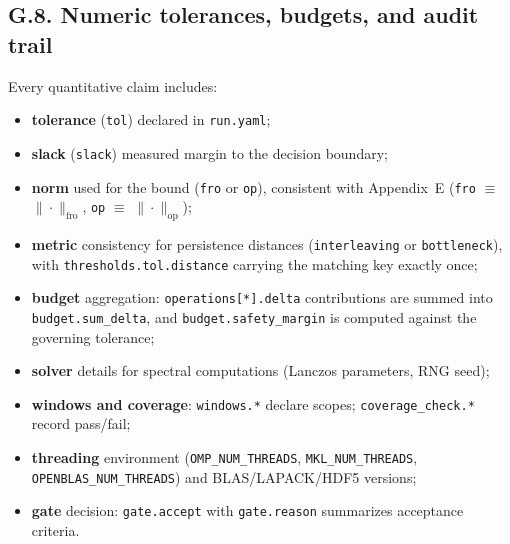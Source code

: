 \documentclass[11pt]{article}
\numberwithin{equation}{section}
\theoremstyle{definition}
\begin{document}
\subsection*{G.8. Numeric tolerances, budgets, and audit trail}
Every quantitative claim includes:
{\setlength{\emergencystretch}{2em}%
\begin{itemize}
\item \textbf{tolerance} (\texttt{tol}) declared in \texttt{run.yaml};
\item \textbf{slack} (\texttt{slack}) measured margin to the decision boundary;
\item \textbf{norm} used for the bound (\texttt{fro} or \texttt{op}), consistent with Appendix~E
(\texttt{fro} \(\equiv\) \(\|\cdot\|_{\mathrm{fro}}\), \texttt{op} \(\equiv\) \(\|\cdot\|_{\mathrm{op}}\));
\item \textbf{metric} consistency for persistence distances (\texttt{interleaving} or \texttt{bottleneck}),
with \texttt{thresholds.\allowbreak tol.\allowbreak distance} carrying the matching key exactly once;
\item \textbf{budget} aggregation: \texttt{operations[*].delta} contributions are summed into
\texttt{budget.sum\_delta}, and \texttt{budget.safety\_margin} is computed against the governing tolerance;
\item \textbf{solver} details for spectral computations (Lanczos parameters, RNG seed);
\item \textbf{windows and coverage}: \texttt{windows.*} declare scopes; \texttt{coverage\_check.*} record pass/fail;
\item \textbf{threading} environment (\texttt{OMP\_\allowbreak NUM\_\allowbreak THREADS}, 
\texttt{MKL\_\allowbreak NUM\_\allowbreak THREADS},
\texttt{OPENBLAS\_\allowbreak NUM\_\allowbreak THREADS}) and BLAS/LAPACK/HDF5 versions;
\item \textbf{gate} decision: \texttt{gate.accept} with \texttt{gate.reason} summarizes acceptance criteria.
\end{itemize}
}
\end{document}
